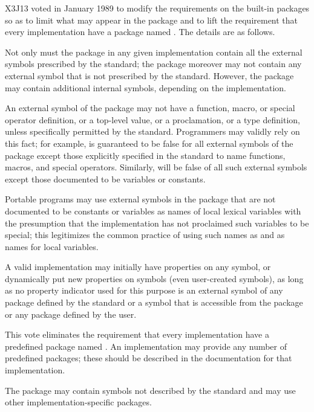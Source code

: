 \begin{new}
X3J13 voted in January 1989
to modify the requirements on the built-in packages
so as to limit what may appear in the  package
and to lift the requirement that every implementation have a package
named .  The details are as follows.

Not only must the  package in any given implementation
contain all the external symbols prescribed by the standard;
the  package moreover may not contain any external symbol
that is not prescribed by the standard.  However, the 
package may contain additional internal symbols, depending on the
implementation.

An external symbol of the  package may not have a function,
macro, or special operator definition, or a top-level value,
or a  proclamation, or a type definition, unless specifically
permitted by the standard.  Programmers may validly rely on this fact;
for example,  is guaranteed to be false for all
external symbols of the  package except those explicitly
specified in the standard to name functions, macros, and special operators.
Similarly,  will be false of all such external symbols
except those documented to be variables or constants.

Portable programs
may use external symbols in the  package that are not documented
to be constants or variables as names of local lexical
variables with the presumption that the implementation has not
proclaimed such variables to be special; this legitimizes the common
practice of using such names as  and  as names
for local variables.

A valid implementation may initially have properties on any symbol,
or dynamically put new properties on symbols (even user-created symbols),
as long as no property indicator used for this purpose is
an external symbol of any package defined by the standard
or a symbol that is accessible from the  package or any
package defined by the user.

This vote eliminates the requirement that every implementation have
a predefined package named .  An implementation may
provide any number of predefined packages; these should be described
in the documentation for that implementation.

The  package may contain symbols not described by the standard
and may use other implementation-specific packages.
\end{new}

